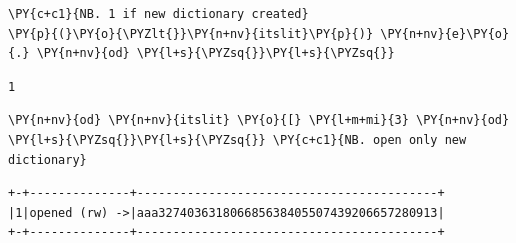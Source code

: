     \begin{tcolorbox}[breakable, size=fbox, boxrule=1pt, pad at break*=1mm,colback=cellbackground, colframe=cellborder]
\begin{Verbatim}[commandchars=\\\{\}]
\PY{c+c1}{NB. 1 if new dictionary created}
\PY{p}{(}\PY{o}{\PYZlt{}}\PY{n+nv}{itslit}\PY{p}{)} \PY{n+nv}{e}\PY{o}{.} \PY{n+nv}{od} \PY{l+s}{\PYZsq{}}\PY{l+s}{\PYZsq{}}
\end{Verbatim}
\end{tcolorbox}

    \begin{Verbatim}[commandchars=\\\{\}]
1
    \end{Verbatim}

    \begin{tcolorbox}[breakable, size=fbox, boxrule=1pt, pad at break*=1mm,colback=cellbackground, colframe=cellborder]
\begin{Verbatim}[commandchars=\\\{\}]
\PY{n+nv}{od} \PY{n+nv}{itslit} \PY{o}{[} \PY{l+m+mi}{3} \PY{n+nv}{od} \PY{l+s}{\PYZsq{}}\PY{l+s}{\PYZsq{}} \PY{c+c1}{NB. open only new dictionary}
\end{Verbatim}
\end{tcolorbox}

    \begin{Verbatim}[commandchars=\\\{\}]
+-+--------------+------------------------------------------+
|1|opened (rw) ->|aaa327403631806685638405507439206657280913|
+-+--------------+------------------------------------------+
    \end{Verbatim}

